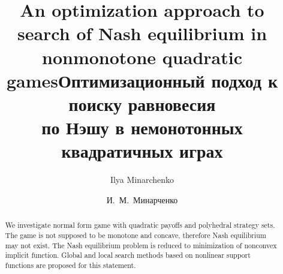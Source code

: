 \begin{englishtitle} %
\title{An optimization approach to search of Nash equilibrium in nonmonotone quadratic games}
\author{Ilya Minarchenko}

\maketitle

\begin{abstract}
We investigate normal form game with quadratic payoffs and polyhedral strategy sets. The game is not supposed to be monotone and concave, therefore Nash equilibrium may not exist. The Nash equilibrium problem is reduced to minimization of nonconvex implicit function. Global and local search methods based on nonlinear support functions are proposed for this statement.

\end{abstract}
\end{englishtitle}

\iffalse
%
%


\documentclass[12pt]{llncs}


\usepackage{iftex}

\ifPDFTeX
\usepackage[T2A]{fontenc}
\usepackage[utf8]{inputenc} %
\usepackage[english,russian]{babel}
\fi

\usepackage{todonotes}

\usepackage[russian]{nla}


\fi

\title{Оптимизационный подход к поиску равновесия\\ по Нэшу в немонотонных квадратичных играх}
\author{И.~М.~Минарченко}



